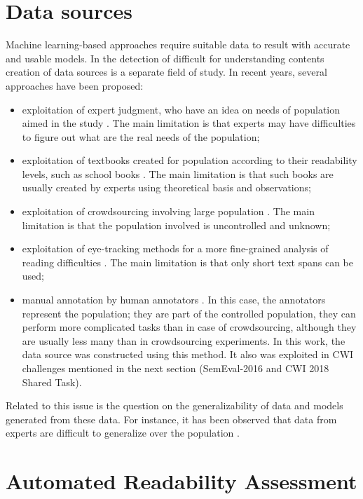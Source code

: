 \section{Data sources}

Machine learning-based approaches require suitable data to result with accurate and usable models. In the detection of difficult for understanding contents creation of data sources is a separate field of study. In recent years, several approaches have been proposed:
\begin{itemize}
\item exploitation of expert judgment, who have an idea on needs of population aimed in the study \citep{DeClerc-NLE2014}. The main limitation is that experts may have difficulties to figure out what are the real needs of the population;
\item exploitation of textbooks created for population according to their readability levels, such as school books \citep{Gala-ELEX2013}. The main limitation is that such books are
  usually created by experts using theoretical basis and observations;
\item exploitation of crowdsourcing involving large population \citep{DeClerc-NLE2014}.  The main limitation is that the population involved is uncontrolled and unknown;
\item exploitation of eye-tracking methods for a more fine-grained
  analysis of reading difficulties \citep{Yaneva-CCA2015,Grabar-ICHI2018}.  The main limitation is that only short text spans can be used;
\item manual annotation by human annotators \citep{Grabar-LREC2016t}. In this case, the annotators represent the population; they are part of the controlled population, they can perform more complicated tasks than in case of crowdsourcing, although they are usually less many than in crowdsourcing experiments. In this work, the data source was constructed using this method. It also was exploited in CWI challenges mentioned in the next section (SemEval-2016 and CWI 2018 Shared Task).
\end{itemize}

Related to this issue is the question on the generalizability of data and models generated from these data.  For instance, it has been observed that data from experts are difficult to generalize over the population \citep{DeClerc-NLE2014}.


\section{Automated Readability Assessment}

